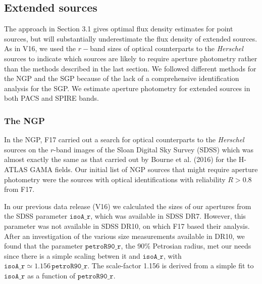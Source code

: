 \documentclass[a4paper,fleqn,usenatbib, twocolumn]{aastex61}
\begin{document}
\subsection{Extended sources} 

The approach in Section 3.1 gives optimal flux density estimates for
point sources, but will substantially underestimate the flux density
of extended sources.  As in V16, we used the $r-$band sizes of optical
counterparts to the {\it Herschel} sources to indicate which sources
are likely to require aperture photometry rather than the methods
described in the last section.  We followed different methods for the
NGP and the SGP because of the lack of a comprehensive identification
analysis for the SGP. We estimate aperture photometry for extended
sources in both PACS and SPIRE bands.

\subsubsection{The NGP}

In the NGP, F17 carried out a search for optical counterparts to the
{\it Herschel} sources on the $r$-band images of the Sloan Digital Sky
Survey (SDSS) which was almost exactly the same as that carried out by
Bourne et al. (2016) for the H-ATLAS GAMA fields.  Our initial list of
NGP sources that might require aperture photometry were the sources
with optical identifications with reliability $R>0.8$ from F17.

In our previous data release (V16) we calculated the sizes of our
apertures from the SDSS parameter $\mathtt{isoA\_r}$, which was
available in SDSS DR7. However, this parameter was not available in
SDSS DR10, on which F17 based their analysis.  After an investigation
of the various size measurements available in DR10, we found that the
parameter $\mathtt{petroR90\_r}$, the 90\% Petrosian radius, met our
needs since there is a simple scaling betwen it and
$\mathtt{isoA\_r}$, with
$\mathtt{isoA\_r} \simeq 1.156 \, \mathtt{petroR90\_r}$.
The scale-factor 1.156 is derived from a simple fit to
$\mathtt{isoA\_r}$ as a function of $\mathtt{petroR90\_r}$.
\end{document}
